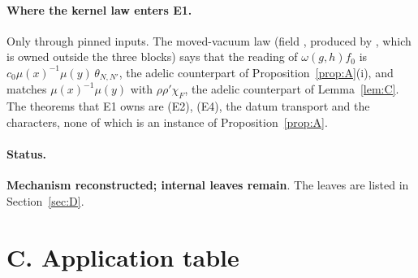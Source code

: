 \documentclass[11pt]{article}
\newcommand{\sM}{\textbf{Mechanism reconstructed; internal leaves remain}}
\theoremstyle{definition}
\theoremstyle{remark}
\begin{document}
\paragraph{Where the kernel law enters E1.} Only through pinned inputs. The moved-vacuum law  (field , produced by , which is owned outside the three blocks) says that the reading of $\omega(g,h)f_0$ is $c_0\mu(x)^{-1}\mu(y)\,\theta_{N,N'}$, the adelic counterpart of Proposition~\ref{prop:A}(i), and  matches $\mu(x)^{-1}\mu(y)$ with $\rho\rho'\chi_F$, the adelic counterpart of Lemma~\ref{lem:C}. The theorems that E1 owns are (E2), (E4), the datum transport and the characters, none of which is an instance of Proposition~\ref{prop:A}.

\paragraph{Status.} \sM. The leaves are listed in Section~\ref{sec:D}.

\section{C. Application table}\label{sec:C}
\end{document}
